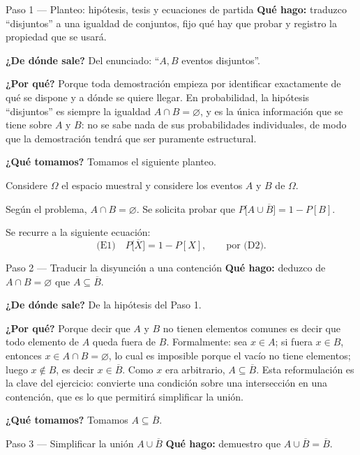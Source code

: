 \documentclass[11pt]{article}
\begin{document}
\begin{sol}

\begin{paso}{Paso 1 --- Planteo: hipótesis, tesis y ecuaciones de partida}
\textbf{Qué hago:} traduzco ``disjuntos'' a una igualdad de conjuntos, fijo qué hay que probar y
registro la propiedad que se usará.

\textbf{¿De dónde sale?} Del enunciado: ``$A,B$ eventos disjuntos''.

\textbf{¿Por qué?} Porque toda demostración empieza por identificar exactamente de qué se
dispone y a dónde se quiere llegar. En probabilidad, la hipótesis ``disjuntos'' es siempre la
igualdad $A\cap B=\varnothing$, y es la única información que se tiene sobre $A$ y $B$: no se
sabe nada de sus probabilidades individuales, de modo que la demostración tendrá que ser
puramente estructural.

\textbf{¿Qué tomamos?} Tomamos el siguiente planteo.

\medskip
Considere $\Omega$ el espacio muestral y considere los eventos $A$ y $B$ de $\Omega$.

Según el problema, $A\cap B=\varnothing$. Se solicita probar que
$P\big[A\cup\overline{B}\big]=1-P[B]$.

\medskip
Se recurre a la siguiente ecuación:
\[
\text{(E1)}\quad P\big[\overline{X}\big]=1-P[X],\qquad\text{por (D2).}
\]
\end{paso}

\begin{paso}{Paso 2 --- Traducir la disyunción a una contención}
\textbf{Qué hago:} deduzco de $A\cap B=\varnothing$ que $A\subseteq\overline{B}$.

\textbf{¿De dónde sale?} De la hipótesis del Paso 1.

\textbf{¿Por qué?} Porque decir que $A$ y $B$ no tienen elementos comunes es decir que todo
elemento de $A$ queda fuera de $B$. Formalmente: sea $x\in A$; si fuera $x\in B$, entonces
$x\in A\cap B=\varnothing$, lo cual es imposible porque el vacío no tiene elementos; luego
$x\notin B$, es decir $x\in\overline{B}$. Como $x$ era arbitrario, $A\subseteq\overline{B}$.
Esta reformulación es la clave del ejercicio: convierte una condición sobre una intersección en
una contención, que es lo que permitirá simplificar la unión.

\textbf{¿Qué tomamos?} Tomamos $A\subseteq\overline{B}$.
\end{paso}

\begin{paso}{Paso 3 --- Simplificar la unión $A\cup\overline{B}$}
\textbf{Qué hago:} demuestro que $A\cup\overline{B}=\overline{B}$.


\end{paso}
\end{sol}
\end{document}
